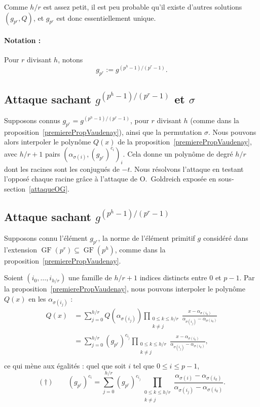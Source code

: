 \documentclass[a4paper, titlepage]{article}
\theoremstyle{definition}
\theoremstyle{remark}
\def\gf{\operatorname{GF}}
\begin{document}
Comme $h/r$ est assez petit, il est peu probable qu'il existe d'autres solutions $(g_{p^r}, Q)$, et $g_{p^r}$ est donc essentiellement unique.

\paragraph*{Notation :} Pour $r$ divisant $h$, notons $$g_{p^r} := g^{(p^h-1)/(p^r-1)}.$$

\subsection{Attaque sachant $g^{(p^h-1)/(p^r-1)}$ et $\sigma$}

Supposons connus $g_{p^r} = g^{(p^h-1)/(p^r-1)}$, pour $r$ divisant $h$ (comme dans la proposition~\ref{premierePropVaudenay}), ainsi que la permutation $\sigma$. Nous pouvons alors interpoler le polynôme $Q(x)$ de la proposition~\ref{premierePropVaudenay}, avec $h/r +1$ pairs ${(\alpha_{\sigma(i)}, (g_{p^r})^{c_i})}_i$. Cela donne un polynôme de degré $h/r$ dont les racines sont les conjugués de $-t$. Nous résolvons l'attaque en testant l'opposé chaque racine grâce à l'attaque de O.~Goldreich exposée en sous-section~\ref{attaqueOG}.

\subsection{Attaque sachant $g^{(p^h-1)/(p^r-1)}$}

Supposons connu l'élément $g_{p^r}$, la norme de l’élément primitif $g$ considéré dans l'extension $\gf(p^r) \subseteq \gf(p^h)$, comme dans la proposition~\ref{premierePropVaudenay}.

Soient $(i_0, \dots, i_{h/r})$ une famille de $h/r + 1$ indices distincts entre $0$ et $p-1$. Par la proposition~\ref{premierePropVaudenay}, nous pouvons interpoler le polynôme $Q(x)$ en les $\alpha_{\sigma(i_j)}$ :
\begin{align*}
Q(x) &= \sum_{j=0}^{h/r} Q\left(\alpha_{\sigma(i_j)}\right) \prod_{\substack{0\leqslant k\leqslant h/r \\ k \neq j}}\frac{x-\alpha_{\sigma(i_k)}}{\alpha_{\sigma(i_j)}-\alpha_{\sigma(i_k)}} \\
&= \sum_{j=0}^{h/r} (g_{p^r})^{c_{i_j}} \prod_{\substack{0\leqslant k\leqslant h/r \\ k \neq j}}\frac{x-\alpha_{\sigma(i_k)}}{\alpha_{\sigma(i_j)}-\alpha_{\sigma(i_k)}}, \\
\end{align*} 
ce qui mène aux égalités : quel que soit $i$ tel que $0\leqslant i \leqslant p-1$,
$$(\dagger) \qquad (g_{p^r})^{c_i} = \sum_{j=0}^{h/r} (g_{p^r})^{c_{i_j}}\prod_{\substack{0\leqslant k\leqslant h/r \\ k \neq j}} \frac{\alpha_{\sigma(i)}-\alpha_{\sigma(i_k)}}{\alpha_{\sigma(i_j)}-\alpha_{\sigma(i_k)}}.$$
\end{document}
